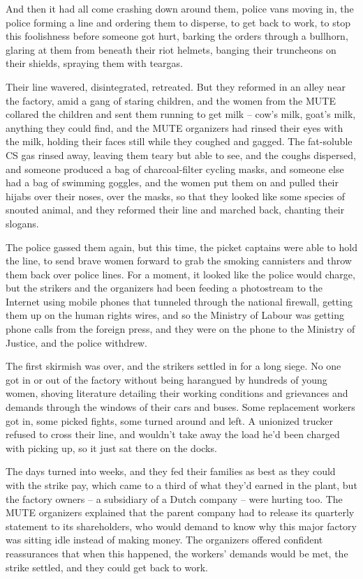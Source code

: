 And then it had all come crashing down around them, police vans
moving in, the police forming a line and ordering them to disperse,
to get back to work, to stop this foolishness before someone got
hurt, barking the orders through a bullhorn, glaring at them from
beneath their riot helmets, banging their truncheons on their
shields, spraying them with teargas.

Their line wavered, disintegrated, retreated. But they reformed in
an alley near the factory, amid a gang of staring children, and the
women from the MUTE collared the children and sent them running to
get milk -- cow's milk, goat's milk, anything they could find, and
the MUTE organizers had rinsed their eyes with the milk, holding
their faces still while they coughed and gagged. The fat-soluble CS
gas rinsed away, leaving them teary but able to see, and the coughs
dispersed, and someone produced a bag of charcoal-filter cycling
masks, and someone else had a bag of swimming goggles, and the
women put them on and pulled their hijabs over their noses, over
the masks, so that they looked like some species of snouted animal,
and they reformed their line and marched back, chanting their
slogans.

The police gassed them again, but this time, the picket captains
were able to hold the line, to send brave women forward to grab the
smoking cannisters and throw them back over police lines. For a
moment, it looked like the police would charge, but the strikers
and the organizers had been feeding a photostream to the Internet
using mobile phones that tunneled through the national firewall,
getting them up on the human rights wires, and so the Ministry of
Labour was getting phone calls from the foreign press, and they
were on the phone to the Ministry of Justice, and the police
withdrew.

The first skirmish was over, and the strikers settled in for a long
siege. No one got in or out of the factory without being harangued
by hundreds of young women, shoving literature detailing their
working conditions and grievances and demands through the windows
of their cars and buses. Some replacement workers got in, some
picked fights, some turned around and left. A unionized trucker
refused to cross their line, and wouldn't take away the load he'd
been charged with picking up, so it just sat there on the docks.

The days turned into weeks, and they fed their families as best as
they could with the strike pay, which came to a third of what
they'd earned in the plant, but the factory owners -- a subsidiary
of a Dutch company -- were hurting too. The MUTE organizers
explained that the parent company had to release its quarterly
statement to its shareholders, who would demand to know why this
major factory was sitting idle instead of making money. The
organizers offered confident reassurances that when this happened,
the workers' demands would be met, the strike settled, and they
could get back to work.

